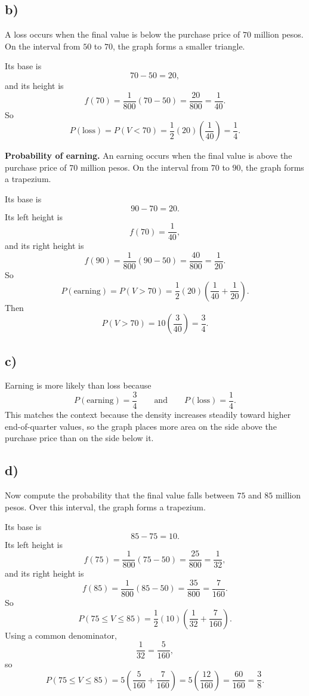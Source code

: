 \subsection*{b)}
A loss occurs when the final value is below the purchase price of $70$ million pesos. On the interval from $50$ to $70$, the graph forms a smaller triangle.

Its base is
\[
70-50=20,
\]
and its height is
\[
f(70)=\frac{1}{800}(70-50)=\frac{20}{800}=\frac{1}{40}.
\]
So
\[
P(\text{loss})=P(V<70)=\frac12(20)\left(\frac{1}{40}\right)=\frac14.
\]

\textbf{Probability of earning.}
An earning occurs when the final value is above the purchase price of $70$ million pesos. On the interval from $70$ to $90$, the graph forms a trapezium.

Its base is
\[
90-70=20.
\]
Its left height is
\[
f(70)=\frac{1}{40},
\]
and its right height is
\[
f(90)=\frac{1}{800}(90-50)=\frac{40}{800}=\frac{1}{20}.
\]
So
\[
P(\text{earning})=P(V>70)=\frac12(20)\left(\frac{1}{40}+\frac{1}{20}\right).
\]
Then
\[
P(V>70)=10\left(\frac{3}{40}\right)=\frac34.
\]


\subsection*{c)}
Earning is more likely than loss because
\[
P(\text{earning})=\frac34
\qquad \text{and} \qquad
P(\text{loss})=\frac14.
\]
This matches the context because the density increases steadily toward higher end-of-quarter values, so the graph places more area on the side above the purchase price than on the side below it.

\subsection*{d)}
Now compute the probability that the final value falls between $75$ and $85$ million pesos. Over this interval, the graph forms a trapezium.

Its base is
\[
85-75=10.
\]
Its left height is
\[
f(75)=\frac{1}{800}(75-50)=\frac{25}{800}=\frac{1}{32},
\]
and its right height is
\[
f(85)=\frac{1}{800}(85-50)=\frac{35}{800}=\frac{7}{160}.
\]
So
\[
P(75\le V\le 85)=\frac12(10)\left(\frac{1}{32}+\frac{7}{160}\right).
\]
Using a common denominator,
\[
\frac{1}{32}=\frac{5}{160},
\]
so
\[
P(75\le V\le 85)=5\left(\frac{5}{160}+\frac{7}{160}\right)
=5\left(\frac{12}{160}\right)=\frac{60}{160}=\frac38.
\]

